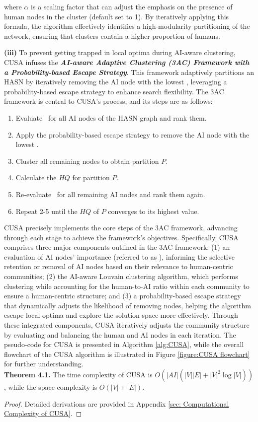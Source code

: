 \noindent where $\alpha$ is a scaling factor that can adjust the emphasis on the presence of human nodes in the cluster (default set to 1). By iteratively applying this formula, the algorithm effectively identifies a high-modularity partitioning of the network, ensuring that clusters contain a higher proportion of humans.

\textbf{(iii)} To prevent getting trapped in local optima during AI-aware clustering, CUSA infuses the \textit{\textbf{AI-aware Adaptive Clustering (3AC) Framework with a Probability-based Escape Strategy}}. This framework adaptively partitions an HASN by iteratively removing the AI node with the lowest \score, leveraging a probability-based escape strategy to enhance search flexibility. The 3AC framework is central to CUSA’s process, and its steps are as follows:

\begin{enumerate}
    \item Evaluate \score\ for all AI nodes of the HASN graph and rank them.
    \item Apply the probability-based escape strategy to remove the AI node with the lowest \score.
    \item Cluster all remaining nodes to obtain partition $P$.
    \item Calculate the $HQ$ for partition $P$.
    \item Re-evaluate \score\ for all remaining AI nodes and rank them again.
    \item Repeat 2-5 until the $HQ$ of $P$ converges to its highest value.
\end{enumerate}

CUSA precisely implements the core steps of the 3AC framework, advancing through each stage to achieve the framework’s objectives. Specifically, CUSA comprises three major components outlined in the 3AC framework: (1) an evaluation of AI nodes’ importance (referred to as \score), informing the selective retention or removal of AI nodes based on their relevance to human-centric communities; (2) the AI-aware Louvain clustering algorithm, which performs clustering while accounting for the human-to-AI ratio within each community to ensure a human-centric structure; and (3) a probability-based escape strategy that dynamically adjusts the likelihood of removing nodes, helping the algorithm escape local optima and explore the solution space more effectively. Through these integrated components, CUSA iteratively adjusts the community structure by evaluating and balancing the human and AI nodes in each iteration. The pseudo-code for CUSA is presented in Algorithm \ref{alg:CUSA}, while the overall flowchart of the CUSA algorithm is illustrated in Figure \ref{figure:CUSA flowchart} for further understanding. \\

\noindent \textbf{Theorem 4.1.} The time complexity of CUSA is $O(|AI|(|V||E| + |V|^2 \log |V|))$, while the space complexity is $O(|V| + |E|)$.
\begin{proof}
Detailed derivations are provided in Appendix \ref{sec: Computational Complexity of CUSA}.
\end{proof}


